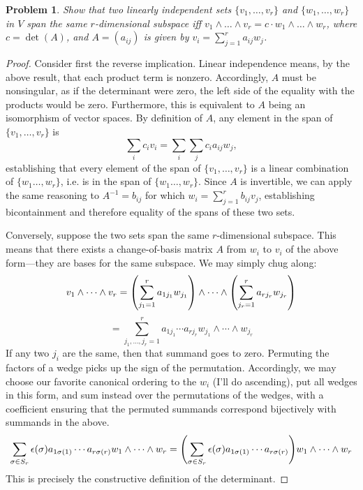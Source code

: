 \documentclass{article}
\newtheorem{plm}{Problem}
\begin{document}
\begin{plm}
  Show that two linearly independent sets $\{v_{1}, \ldots, v_{r}\}$ and $\{w_{1}, \ldots, w_{r}\}$ in $V$
  span the same $r$-dimensional subspace iff $v_{1} \land \ldots \land v_{r}= c \cdot w_{1} \land \ldots \land w_{r}$,
  where $c = \det(A)$, and $A = (a_{ij})$ is given by $v_{i} = \sum_{j = 1}^{r}a_{ij}w_{j}$.
\end{plm}

\begin{proof}
  Consider first the reverse implication.
  Linear independence means, by the above result, that each product term is nonzero.
  Accordingly, $A$ must be nonsingular, as if the determinant were zero, the left side of the equality with the products would be zero.
  Furthermore, this is equivalent to $A$ being an isomorphism of vector spaces.
  By definition of $A$, any element in the span of $\{v_{1}, \ldots, v_{r}\}$ is
  \[
    \sum_{i}c_{i}v_{i} = \sum_{i}\sum_{j}c_{i}a_{ij}w_{j},
  \]
  establishing that every element of the span of $\{v_{1}, \ldots, v_{r}\}$ is a linear combination of $\{w_{1} \ldots, w_{r}\}$,
  i.e. is in the span of $\{w_{1} \ldots, w_{r}\}$.
  Since $A$ is invertible, we can apply the same reasoning to $A^{-1} = b_{ij}$ for which $w_{i} = \sum_{j = 1}^{r}b_{ij}v_{j}$,
  establishing bicontainment and therefore equality of the spans of these two sets.

  Conversely, suppose the two sets span the same $r$-dimensional subspace.
  This means that there exists a change-of-basis matrix $A$ from $w_{i}$ to $v_{i}$ of the above form---they are bases for the same subspace.
  We may simply chug along:
  \[
    v_{1} \wedge \cdots \wedge v_{r} = \qty(\sum_{j_{1} = 1}^{r}a_{1j_{1}}w_{j_{1}}) \wedge \cdots \wedge \qty(\sum_{j_{r} = 1}^{r}a_{rj_{r}}w_{j_{r}})
  \]
  \[
    = \sum_{j_{1}, \ldots, j_{r} = 1}^{r}a_{1j_{1}} \cdots a_{rj_{r}} w_{j_{1}} \wedge \cdots \wedge w_{j_{r}}
  \]
  If any two $j_{i}$ are the same, then that summand goes to zero.
  Permuting the factors of a wedge picks up the sign of the permutation.
  Accordingly, we may choose our favorite canonical ordering to the $w_{i}$ (I'll do ascending), put all wedges in this form,
  and sum instead over the permutations of the wedges, with a coefficient ensuring that the permuted summands correspond
  bijectively with summands in the above.
  \[
    \sum_{\sigma \in S_{r}} \epsilon(\sigma)a_{1\sigma(1)}\cdots a_{r\sigma(r)} w_{1} \wedge \cdots \wedge w_{r}
    = \qty(\sum_{\sigma \in S_{r}} \epsilon(\sigma)a_{1\sigma(1)}\cdots a_{r\sigma(r)}) w_{1} \wedge \cdots \wedge w_{r}
  \]
  This is precisely the constructive definition of the determinant.
\end{proof}
\end{document}
